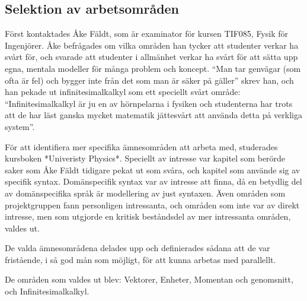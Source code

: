 \begin{binge}
\section{Selektion av arbetsområden}


\begin{draft}
  Först kontaktades Åke Fäldt, som är examinator för kursen TIF085,
  Fysik för Ingenjörer. Åke befrågades om vilka områden han tycker att
  studenter verkar ha svårt för, och svarade att studenter i allmänhet
  verkar ha svårt för att sätta upp egna, mentala modeller för många
  problem och koncept. ``Man tar genvägar (som ofta är fel) och bygger
  inte från det som man är säker på gäller'' skrev han, och han pekade
  ut infinitesimalkalkyl som ett speciellt svårt område:
  ``Infinitesimalkalkyl är ju en av hörnpelarna i fysiken och
  studenterna har trots att de har läst ganska mycket matematik
  jättesvårt att använda detta på verkliga system''.

  För att identifiera mer specifika ämnesområden att arbeta med,
  studerades kursboken *Univeristy Physics*. Speciellt av intresse var
  kapitel som berörde saker som Åke Fäldt tidigare pekat ut som svåra,
  och kapitel som använde sig av specifik syntax. Domänspecifik syntax
  var av intresse att finna, då en betydlig del av domänspecifika språk
  är modellering av just syntaxen. Även områden som projektgruppen fann
  personligen intressanta, och områden som inte var av direkt intresse,
  men som utgjorde en kritisk beståndsdel av mer intressanta områden,
  valdes ut.
\end{draft}

De valda ämnesområdena delades upp och definierades sådana att de var
fristående, i så god mån som möjligt, för att kunna arbetas med
parallellt.

De områden som valdes ut blev: Vektorer, Enheter, Momentan och
genomsnitt, och Infinitesimalkalkyl.


\end{binge}

